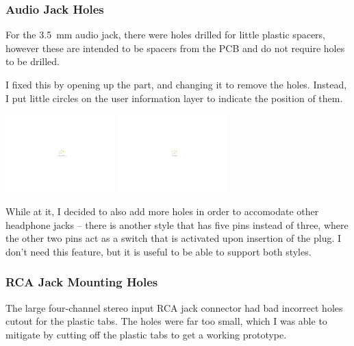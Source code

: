 \documentclass[a4paper]{article}
\begin{document}
\subsubsection{Audio Jack Holes}

For the \SI{3.5}{\milli\meter} audio jack, there were holes drilled for little plastic spacers, however these are intended to be spacers from the PCB and do not require holes to be drilled.


I fixed this by opening up the part, and changing it to remove the holes. Instead, I put little circles on the user information layer to indicate the position of them.

\begin{center}
\includegraphics[height=3cm,trim={13.7cm 9.7cm 13cm 9.7cm},clip]{images/headphone-jack-bad.pdf}
\includegraphics[height=3cm,trim={14.5cm 9.7cm 13.7cm 9.7cm},clip]{images/headphone-jack-fixed.pdf}
\end{center}

While at it, I decided to also add more holes in order to accomodate other headphone jacks -- there is another style that has five pins instead of three, where the other two pins act as a switch that is activated upon insertion of the plug. I don't need this feature, but it is useful to be able to support both styles.


\subsubsection{RCA Jack Mounting Holes}

The large four-channel stereo input RCA jack connector had bad incorrect holes cutout for the plastic tabs. The holes were far too small, which I was able to mitigate by cutting off the plastic tabs to get a working prototype.
\end{document}

